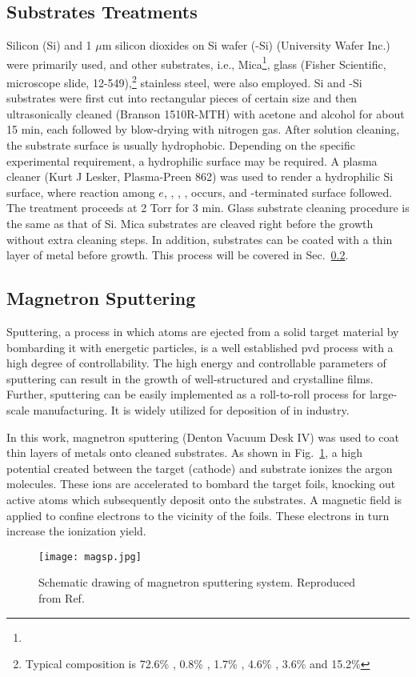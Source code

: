 \subsection{Substrates Treatments}\label{ch2sub}

Silicon (Si) and 1 $\mu$m silicon dioxides on Si wafer (-Si) (University Wafer Inc.) were primarily used, and other substrates, i.e., Mica\footnote{}, glass (Fisher Scientific, microscope slide, 12-549),\footnote{Typical composition is 72.6\% , 0.8\% , 1.7\% , 4.6\% , 3.6\%  and 15.2\% } stainless steel, were also employed. Si and -Si substrates were first cut into rectangular pieces of certain size and then ultrasonically cleaned (Branson 1510R-MTH) with acetone and alcohol for about 15 min, each followed by blow-drying with nitrogen gas. After solution cleaning, the substrate surface is usually hydrophobic. Depending on the specific experimental requirement, a hydrophilic surface may be required. A plasma cleaner (Kurt J Lesker, Plasma-Preen 862) was used to render a hydrophilic Si surface, where reaction among $e$, , , , occurs, and -terminated surface followed.\cite{Habib2010} The treatment proceeds at 2 Torr  for 3 min. Glass substrate cleaning procedure is the same as that of Si. Mica substrates are cleaved right before the growth without extra cleaning steps. In addition, substrates can be coated with a thin layer of metal before growth. This process will be covered in Sec.~\ref{sec:mag}.

\subsection{Magnetron Sputtering}\label{sec:mag}
Sputtering, a process in which atoms are ejected from a solid target material by bombarding it with energetic particles, is a well established \gls{pvd} process with a high degree of controllability. The high energy and controllable parameters of sputtering can result in the growth of well-structured and crystalline films. Further, sputtering can be easily implemented as a roll-to-roll process for large-scale manufacturing. It is widely utilized for deposition of  in industry.

In this work, magnetron sputtering (Denton Vacuum Desk IV) was used to coat thin layers of metals onto cleaned substrates. As shown in Fig.~\ref{fig:ch2magsp}, a high potential created between the target (cathode) and substrate ionizes the argon molecules. These ions are accelerated to bombard the target foils, knocking out active atoms which subsequently deposit onto the substrates. A magnetic field is applied to confine electrons to the vicinity of the foils. These electrons in turn increase the ionization yield. 
\begin{figure}[htb]
\centering
\texttt{[image: magsp.jpg]}
\caption[Schematic drawing of magnetron sputtering system]{Schematic drawing of magnetron sputtering system. Reproduced from Ref.\cite{Song2008}}
\label{fig:ch2magsp}
\end{figure}


